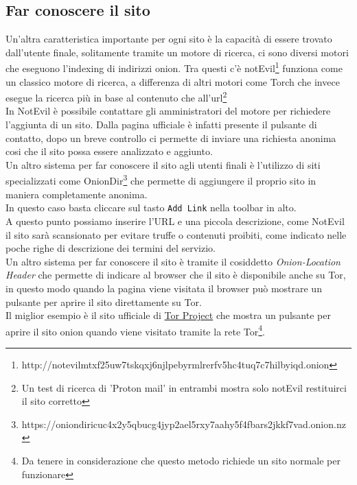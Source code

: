 \subsection{Far conoscere il sito}
Un'altra caratteristica importante per ogni sito è la capacità di essere trovato dall'utente finale, solitamente tramite un motore di ricerca, ci sono diversi motori che eseguono l'indexing di indirizzi onion. Tra questi c'è notEvil\footnote{http://notevilmtxf25uw7tskqxj6njlpebyrmlrerfv5hc4tuq7c7hilbyiqd.onion} funziona come un classico motore di ricerca, a differenza di altri motori come Torch che invece esegue la ricerca più in base al contenuto che all'url\footnote{Un test di ricerca di 'Proton mail' in entrambi mostra solo notEvil restituirci il sito corretto} \\
In NotEvil è possibile contattare gli amministratori del motore per richiedere l'aggiunta di un sito. 
Dalla pagina ufficiale è infatti presente il pulsante di contatto, dopo un breve controllo ci permette di inviare una richiesta anonima cosi che il sito possa essere analizzato e aggiunto. \\
Un altro sistema per far conoscere il sito agli utenti finali è l'utilizzo di siti specializzati come OnionDir\footnote{https://oniondiricuc4x2y5qbucg4jyp2ael5rxy7aahy5f4fbars2jkkf7vad.onion.nz} che permette di aggiungere il proprio sito in maniera completamente anonima. \\
In questo caso basta cliccare sul tasto \lstinline{Add Link} nella toolbar in alto. \\
A questo punto possiamo inserire l'URL e una piccola descrizione, come NotEvil il sito sarà scansionato per evitare truffe o contenuti proibiti, come indicato nelle poche righe di descrizione dei termini del servizio. \\
\newpage
Un altro sistema per far conoscere il sito è tramite il cosiddetto \emph{Onion-Location Header} che permette di indicare al browser che il sito è disponibile anche su Tor, in questo modo quando la pagina viene visitata il browser può mostrare un pulsante per aprire il sito direttamente su Tor. \\
Il miglior esempio è il sito ufficiale di \href{www.torproject.org}{Tor Project} che mostra un pulsante per aprire il sito onion quando viene visitato tramite la rete Tor\footnote{Da tenere in considerazione che questo metodo richiede un sito normale per funzionare}. \\

